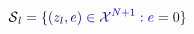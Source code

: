 \documentclass[12pt]{article}
\begin{document}
\makeatletter
\renewcommand*{\@textcolor}[3]{%
  \protect\leavevmode
  \begingroup
    \color#1{#2}#3%
  \endgroup
}
\makeatother
\begin{displaymath}
\mathcal { \mathcolor[RGB]{0,0,15}{S} } _ { \mathcolor[RGB]{0,0,30}{l} } \mathcolor[RGB]{0,0,45}{=} \mathcolor[RGB]{0,0,60}{\{} \mathcolor[RGB]{0,0,75}{(} \mathcolor[RGB]{0,0,90}{z} _ { \mathcolor[RGB]{0,0,105}{l} } \mathcolor[RGB]{0,0,120}{,} \mathcolor[RGB]{0,0,135}{e} \mathcolor[RGB]{0,0,150}{)} \mathcolor[RGB]{0,0,165}{\in} \mathcal { \mathcolor[RGB]{0,0,180}{X} } ^ { \mathcolor[RGB]{0,0,195}{N} \mathcolor[RGB]{0,0,210}{+} \mathcolor[RGB]{0,0,225}{1} } \mathcolor[RGB]{0,0,240}{:} \mathcolor[RGB]{0,0,255}{e} \mathcolor[RGB]{0,15,0}{=} \mathcolor[RGB]{0,15,15}{0} \mathcolor[RGB]{0,15,30}{\}}
\end{displaymath}
\end{document}
